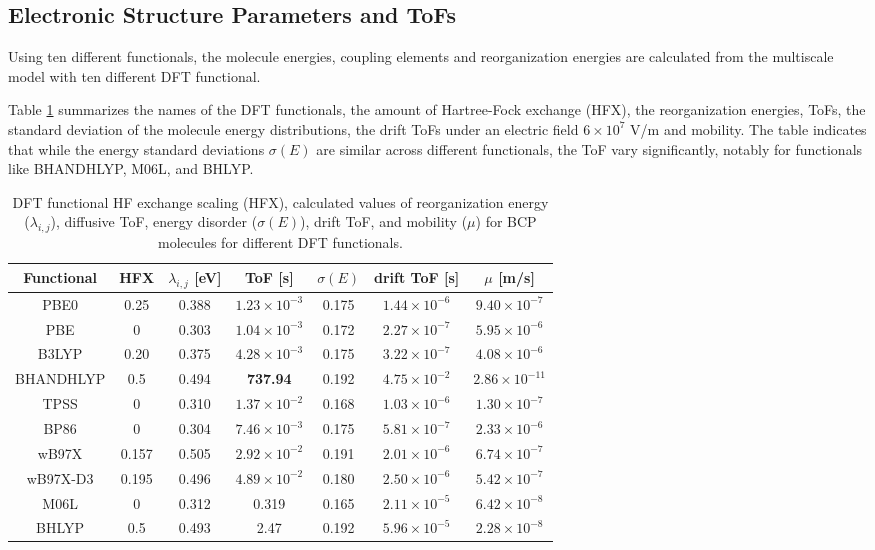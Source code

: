 \documentclass[letterpaper,12pt]{article}
\begin{document}
\subsection{Electronic Structure Parameters and ToFs}
Using ten different functionals, the molecule energies, coupling elements and reorganization energies are calculated from the multiscale model with ten different DFT functional.

Table \ref{tab:para} summarizes the names of the DFT functionals, the amount of Hartree-Fock exchange (HFX), the reorganization energies, ToFs, the standard deviation of the molecule energy distributions, the drift ToFs under an electric field $6 \times 10^7$ V/m and mobility.
The table indicates that while the energy standard deviations $\sigma(E)$ are similar across different functionals, the ToF vary significantly, notably for functionals like BHANDHLYP, M06L, and BHLYP.

\begin{table}[H]
    \centering
    \begin{tabular}{c c c c c c c}
    \hline
        Functional & HFX & $\lambda_{i,j}$ [eV] & ToF [s] & $\sigma(E)$ & drift ToF [s] & $\mu$ [m/s] \\ 
        \hline
        PBE0 & 0.25 & 0.388 & $1.23\times 10^{-3}$ & 0.175 & $1.44 \times 10^{-6}$ & $9.40\times 10^{-7}$ \\
        PBE & 0 & 0.303 & $1.04\times 10^{-3}$ & 0.172 & $2.27 \times 10^{-7}$ & $5.95 \times 10^{-6}$ \\ 
        B3LYP & 0.20 & 0.375 & $4.28\times 10^{-3}$ & 0.175  & $3.22\times 10^{-7}$ & $4.08 \times 10^{-6}$ \\
        BHANDHLYP & 0.5 & 0.494 & \textbf{737.94} & 0.192  & $4.75\times 10^{-2}$ & $2.86\times 10^{-11}$ \\
        TPSS & 0 & 0.310 & $1.37\times 10^{-2}$ & 0.168  & $1.03 \times 10^{-6}$ & $1.30\times 10^{-7}$ \\
        BP86 & 0 & 0.304 & $7.46\times 10^{-3}$ & 0.175  & $5.81 \times 10^{-7}$ & $2.33\times 10^{-6}$ \\
        wB97X & 0.157 & 0.505 & $2.92\times 10^{-2}$ & 0.191  & $2.01\times 10^{-6}$  & $6.74\times 10^{-7}$ \\
        wB97X-D3 & 0.195 & 0.496 & $4.89\times 10^{-2}$ & 0.180  & $2.50 \times 10^{-6}$ & $5.42 \times 10^{-7}$ \\
        M06L & 0 & 0.312 & 0.319 & 0.165 & $2.11 \times 10^{-5}$ & $6.42 \times 10^{-8}$ \\
        BHLYP & 0.5 & 0.493 & 2.47 & 0.192  & $5.96 \times 10^{-5}$ & $ 2.28\times 10^{-8}$  \\
    \hline
    \end{tabular}
    \caption{DFT functional HF exchange scaling (HFX), calculated values of reorganization energy ($\lambda_{i,j}$), diffusive ToF, energy disorder ($\sigma(E)$), drift ToF, and mobility ($\mu$) for BCP molecules for different DFT functionals.}
    \label{tab:para}
\end{table}
\end{document}
